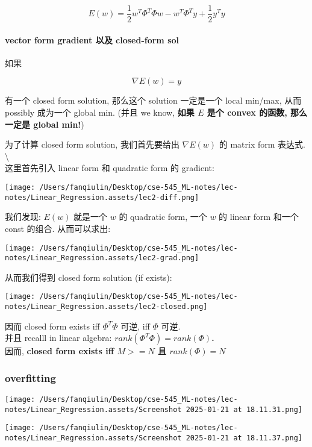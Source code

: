 \documentclass[
]{article}
\begin{document}
\[E(w) = \frac{1}{2}w^T \Phi^T \Phi w - w^T \Phi^T y + \frac{1}{2}y^T y\]

\hypertarget{vector-form-gradient-ux4ee5ux53ca-closed-form-sol}{%
\paragraph{vector form gradient 以及 closed-form
sol}\label{vector-form-gradient-ux4ee5ux53ca-closed-form-sol}}

如果

\[\nabla E(w) = y\]

有一个 closed form solution, 那么这个 solution 一定是一个 local min/max,
从而 possibly 成为一个 global min. (并且 we know, \textbf{如果 \(E\)
是个 convex 的函数, 那么一定是 global min!})

为了计算 closed form solution, 我们首先要给出 \(\nabla E(w)\) 的 matrix
form 表达式. \textbackslash{}\\
这里首先引入 linear form 和 quadratic form 的 gradient:

\texttt{[image: /Users/fanqiulin/Desktop/cse-545\_ML-notes/lec-notes/Linear\_Regression.assets/lec2-diff.png]}

我们发现: \(E(w)\) 就是一个 \(w\) 的 quadratic form, 一个 \(w\) 的
linear form 和一个 const 的组合. 从而可以求出:

\texttt{[image: /Users/fanqiulin/Desktop/cse-545\_ML-notes/lec-notes/Linear\_Regression.assets/lec2-grad.png]}

从而我们得到 closed form solution (if exists):

\texttt{[image: /Users/fanqiulin/Desktop/cse-545\_ML-notes/lec-notes/Linear\_Regression.assets/lec2-closed.png]}

因而 closed form exists iff \(\Phi^T\Phi\) 可逆, iff \(\Phi\) 可逆.\\
并且 recalll in linear algebra:
\textbf{\(rank(\Phi^T\Phi) = rank(\Phi)\).}\\
因而, \textbf{closed form exists iff \(M >= N \) 且 \(rank(\Phi) = N\)}

\hypertarget{overfitting}{%
\subsubsection{overfitting}\label{overfitting}}

\texttt{[image: /Users/fanqiulin/Desktop/cse-545\_ML-notes/lec-notes/Linear\_Regression.assets/Screenshot 2025-01-21 at 18.11.31.png]}

\texttt{[image: /Users/fanqiulin/Desktop/cse-545\_ML-notes/lec-notes/Linear\_Regression.assets/Screenshot 2025-01-21 at 18.11.37.png]}
\end{document}
